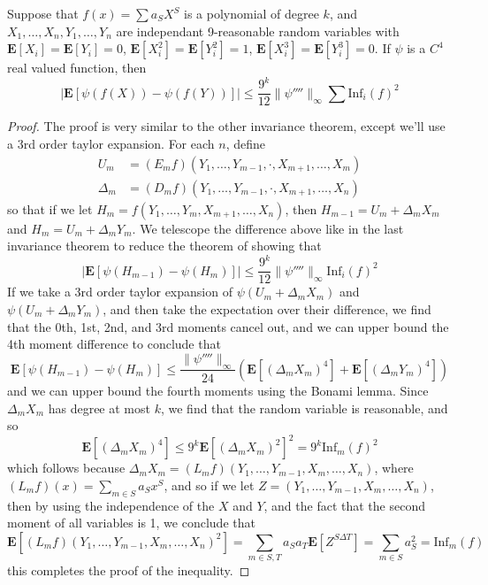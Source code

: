 \begin{theorem}
    Suppose that $f(x) = \sum a_S X^S$ is a polynomial of degree $k$, and $X_1, \dots, X_n, Y_1, \dots, Y_n$ are independant 9-reasonable random variables with $\mathbf{E}[X_i] = \mathbf{E}[Y_i] = 0$, $\mathbf{E}[X_i^2] = \mathbf{E}[Y_i^2] = 1$, $\mathbf{E}[X_i^3] = \mathbf{E}[Y_i^3] = 0$. If $\psi$ is a $C^4$ real valued function, then
    \[ |\mathbf{E}[\psi(f(X)) - \psi(f(Y))]| \leq \frac{9^k}{12} \| \psi'''' \|_\infty \sum \text{Inf}_i(f)^2 \]
\end{theorem}
\begin{proof}
    The proof is very similar to the other invariance theorem, except we'll use a 3rd order taylor expansion. For each $n$, define
    \begin{align*}
        U_m &= (E_m f)(Y_1, \dots, Y_{m-1}, \cdot, X_{m+1}, \dots, X_m)\\
        \Delta_m &= (D_m f)(Y_1, \dots, Y_{m-1}, \cdot, X_{m+1}, \dots, X_n)
    \end{align*}
    so that if we let $H_m = f(Y_1, \dots, Y_m, X_{m+1}, \dots, X_n)$, then $H_{m-1} = U_m + \Delta_m X_m$ and $H_m = U_m + \Delta_m Y_m$. We telescope the difference above like in the last invariance theorem to reduce the theorem of showing that
    \[ |\mathbf{E}[\psi(H_{m-1}) - \psi(H_m)]| \leq \frac{9^k}{12} \| \psi'''' \|_\infty \text{Inf}_i(f)^2 \]
    If we take a 3rd order taylor expansion of $\psi(U_m + \Delta_m X_m)$ and $\psi(U_m + \Delta_m Y_m)$, and then take the expectation over their difference, we find that the 0th, 1st, 2nd, and 3rd moments cancel out, and we can upper bound the 4th moment difference to conclude that
    \[ \mathbf{E}[\psi(H_{m-1}) - \psi(H_m)] \leq \frac{\| \psi'''' \|_\infty}{24} (\mathbf{E}[(\Delta_m X_m)^4] + \mathbf{E}[(\Delta_m Y_m)^4]) \]
    and we can upper bound the fourth moments using the Bonami lemma. Since $\Delta_m X_m$ has degree at most $k$, we find that the random variable is reasonable, and so
    \[ \mathbf{E}[(\Delta_m X_m)^4] \leq 9^k \mathbf{E}[(\Delta_m X_m)^2]^2 = 9^k \text{Inf}_m(f)^2 \]
    which follows because $\Delta_m X_m = (L_m f)(Y_1, \dots, Y_{m-1}, X_m, \dots, X_n)$, where $(L_m f)(x) = \sum_{m \in S} a_S x^S$, and so if we let $Z = (Y_1, \dots, Y_{m-1}, X_m, \dots, X_n)$, then by using the independence of the $X$ and $Y$, and the fact that the second moment of all variables is 1, we conclude that
    \[ \mathbf{E}[(L_m f)(Y_1, \dots, Y_{m-1}, X_m, \dots, X_n)^2] = \sum_{m \in S,T} a_S a_T \mathbf{E}[Z^{S \Delta T}] = \sum_{m \in S} a_S^2 = \text{Inf}_m(f) \]
    this completes the proof of the inequality.
\end{proof}

